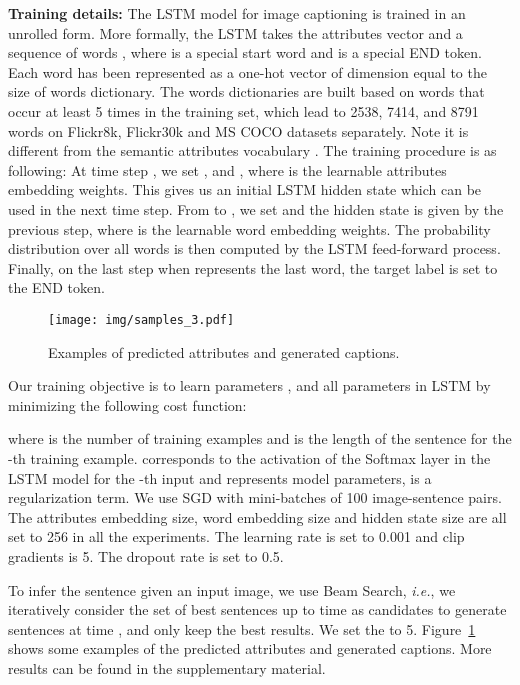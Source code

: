 \documentclass[10pt,journal,compsoc]{IEEEtran}
\newcommand{\ie}{\emph{i.e.}}
\begin{document}
\vspace{3pt}
\noindent \textbf{Training details:} The LSTM model for image captioning is trained in an unrolled form. More formally, the LSTM takes the attributes vector  and a sequence of words , where  is a special start word and  is a special END token. Each word has been represented as a one-hot vector  of dimension equal to the size of words dictionary. The words dictionaries are built based on words that occur at least 5 times in the training set, which lead to 2538, 7414, and 8791 words on Flickr8k, Flickr30k and MS COCO datasets separately. Note it is different from the semantic attributes vocabulary . The training procedure is as following: At time step , we set ,  and , where  is the learnable attributes embedding weights. This gives us an initial LSTM hidden state  which can be used in the next time step. From  to , we set  and the hidden state  is given by the previous step, where  is the learnable word embedding weights. The probability distribution  over all words is then computed by the LSTM feed-forward process. Finally, on the last step when  represents the last word, the target label is set to the END token.

\begin{figure}[t]
\begin{center}
   \texttt{[image: img/samples\_3.pdf]}
\end{center}
\vspace{-10pt}
   \caption{Examples of predicted attributes and generated captions.}
   \vspace{-7pt}
   \label{att_caP_examples}
\end{figure}

Our training objective is to learn parameters ,  and all parameters in LSTM by minimizing the following cost function:

where  is the number of training examples and  is the length of the sentence for the -th training example.  corresponds to the activation of the Softmax layer in the LSTM model for the -th input and  represents model parameters,  is a regularization term. We use SGD with mini-batches of 100 image-sentence pairs. The attributes embedding size, word embedding size and hidden state size are all set to 256 in all the experiments. The learning rate is set to 0.001 and clip gradients is 5. The dropout rate is set to 0.5.

To infer the sentence given an input image, we use Beam Search, \ie, we iteratively consider the set of  best sentences up to time  as candidates to generate sentences at time , and only keep the best  results. We set the  to 5. Figure~\ref{att_caP_examples} shows some examples of the predicted attributes and generated captions. More results can be found in the supplementary material.
 
\end{document}
